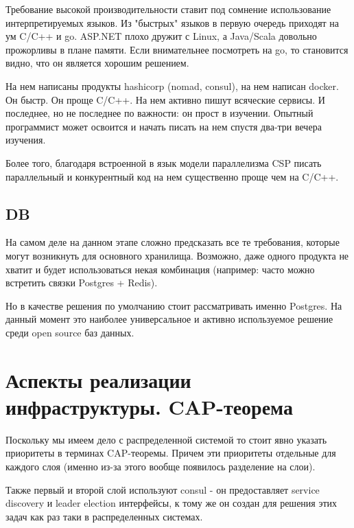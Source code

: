 Требование высокой производительности ставит под сомнение использование интерпретируемых языков. Из "быстрых" языков в первую очередь приходят на ум C/C++ и go. ASP.NET плохо дружит с Linux, а Java/Scala довольно прожорливы в плане памяти. Если внимательнее посмотреть на go, то становится видно, что он является хорошим решением.

На нем написаны продукты hashicorp (nomad, consul), на нем написан docker. Он быстр. Он проще C/C++. На нем активно пишут всяческие сервисы. И последнее, но не последнее по важности: он прост в изучении. Опытный программист может освоится и начать писать на нем спустя два-три вечера изучения.

Более того, благодаря встроенной в язык модели параллелизма CSP писать параллельный и конкурентный код на нем существенно проще чем на C/C++.


\subsection{DB}

На самом деле на данном этапе сложно предсказать все те требования, которые могут возникнуть для основного хранилища. Возможно, даже одного продукта не хватит и будет использоваться некая комбинация (например: часто можно встретить связки Postgres + Redis).

Но в качестве решения по умолчанию стоит рассматривать именно Postgres. На данный момент это наиболее универсальное и активно используемое решение среди open source баз данных.

\section{Аспекты реализации инфраструктуры. CAP-теорема}

Поскольку мы имеем дело с распределенной системой то стоит явно указать приоритеты в терминах CAP-теоремы. Причем эти приоритеты отдельные для каждого слоя (именно из-за этого вообще появилось разделение на слои).

Также первый и второй слой используют consul - он предоставляет service discovery и leader election интерфейсы, к тому же он создан для решения этих задач как раз таки в распределенных системах.



